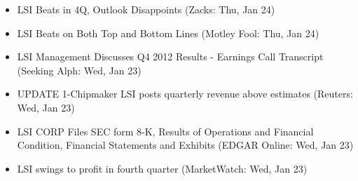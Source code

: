\documentclass[11pt,asymmetric]{article}
\begin{document}
\begin{itemize}
\item LSI Beats in 4Q, Outlook Disappoints (Zacks: Thu, Jan 24)
\item LSI Beats on Both Top and Bottom Lines (Motley Fool: Thu, Jan 24)
\item LSI Management Discusses Q4 2012 Results - Earnings Call Transcript (Seeking Alph: Wed, Jan 23)
\item UPDATE 1-Chipmaker LSI posts quarterly revenue above estimates (Reuters: Wed, Jan 23)
\item LSI CORP Files SEC form 8-K, Results of Operations and Financial Condition, Financial Statements and Exhibits (EDGAR Online: Wed, Jan 23)
\item LSI swings to profit in fourth quarter (MarketWatch: Wed, Jan 23)
\end{itemize}
\end{document}
